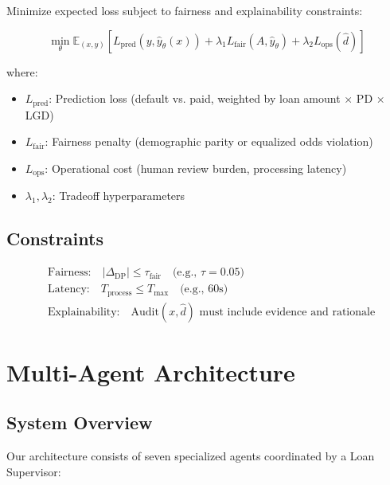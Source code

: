 \documentclass[11pt]{article}
\begin{document}
Minimize expected loss subject to fairness and explainability constraints:

\begin{equation}
\min_{\theta} \mathbb{E}_{(x,y)} \left[ L_{\text{pred}}(y, \hat{y}_\theta(x)) + \lambda_1 L_{\text{fair}}(A, \hat{y}_\theta) + \lambda_2 L_{\text{ops}}(\hat{d}) \right]
\end{equation}

where:
\begin{itemize}
    \item $L_{\text{pred}}$: Prediction loss (default vs. paid, weighted by loan amount × PD × LGD)
    \item $L_{\text{fair}}$: Fairness penalty (demographic parity or equalized odds violation)
    \item $L_{\text{ops}}$: Operational cost (human review burden, processing latency)
    \item $\lambda_1, \lambda_2$: Tradeoff hyperparameters
\end{itemize}

\subsection{Constraints}

\begin{align}
&\text{Fairness:} \quad |\Delta_{\text{DP}}| \leq \tau_{\text{fair}} \quad \text{(e.g., } \tau = 0.05 \text{)} \\
&\text{Latency:} \quad T_{\text{process}} \leq T_{\text{max}} \quad \text{(e.g., } 60\text{s)} \\
&\text{Explainability:} \quad \text{Audit}(x, \hat{d}) \text{ must include evidence and rationale}
\end{align}

\section{Multi-Agent Architecture}

\subsection{System Overview}

Our architecture consists of seven specialized agents coordinated by a Loan Supervisor:
\end{document}
